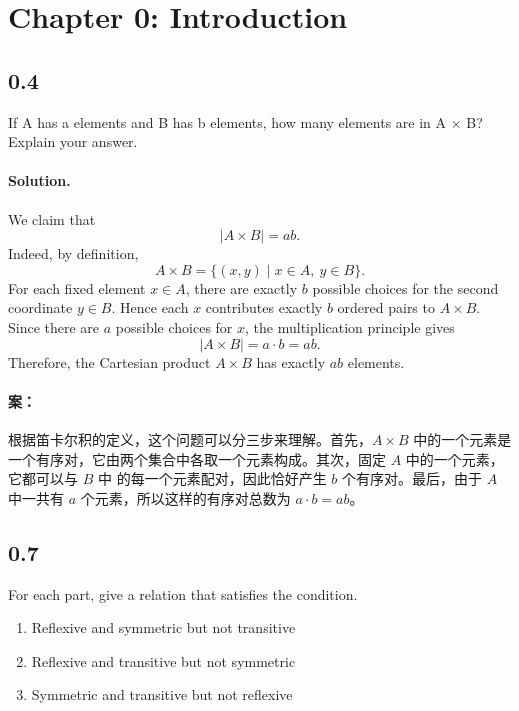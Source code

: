 \section*{Chapter 0: Introduction}

\subsection*{0.4}

If A has a elements and B has b elements, how many elements are in A $\times$ B? Explain your answer.

\paragraph{Solution.}
We claim that
\[
|A \times B| = ab.
\]
Indeed, by definition,
\[
A \times B = \{(x,y) \mid x \in A,\ y \in B\}.
\]
For each fixed element $x \in A$, there are exactly $b$ possible choices for the second coordinate $y \in B$. Hence each $x$ contributes exactly $b$ ordered pairs to $A \times B$. Since there are $a$ possible choices for $x$, the multiplication principle gives
\[
|A \times B| = a \cdot b = ab.
\]
Therefore, the Cartesian product $A \times B$ has exactly $ab$ elements.

\paragraph{案：} 根据笛卡尔积的定义，这个问题可以分三步来理解。首先，$A \times B$ 中的一个元素是一个有序对，它由两个集合中各取一个元素构成。其次，固定 $A$ 中的一个元素，它都可以与 $B$ 中
  的每一个元素配对，因此恰好产生 $b$ 个有序对。最后，由于 $A$ 中一共有 $a$ 个元素，所以这样的有序对总数为 $a \cdot b = ab$。


\subsection*{0.7}

For each part, give a relation that satisfies the condition.

\begin{enumerate}[label=(\alph*), leftmargin=2.5em]

\item Reflexive and symmetric but not transitive

\item Reflexive and transitive but not symmetric

\item Symmetric and transitive but not reflexive

\end{enumerate}

